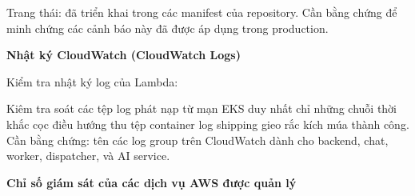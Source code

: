 Trang thái: đã triển khai trong các manifest của repository. Cần bằng
chứng để minh chứng các cảnh báo này đã được áp dụng trong production.

\vspace{0.5em}\noindent\textbf{Nhật ký CloudWatch (CloudWatch
Logs)}\par

Kiểm tra nhật ký log của Lambda:

\begin{Shaded}
\begin{Highlighting}[]
\DataTypeTok{\textbackslash{}}
  \DataTypeTok{\textbackslash{}}

\DataTypeTok{\textbackslash{}}
  \DataTypeTok{\textbackslash{}}
\end{Highlighting}
\end{Shaded}

Kiêm tra soát các tệp log phát nạp từ mạn EKS duy nhất chỉ những chuỗi
thời khắc cọc điều hướng thu tệp container log shipping gieo rắc kích
múa thành công. Cần bằng chứng: tên các log group trên CloudWatch dành
cho backend, chat, worker, dispatcher, và AI service.

\vspace{0.5em}\noindent\textbf{Chỉ số giám sát của các dịch vụ AWS được quản
lý}\par

